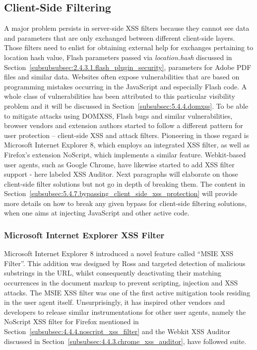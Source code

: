   \subsection{Client-Side Filtering}
  \label{subsec:4.4.client_side_filtering}
    
    A major problem persists in server-side XSS filters because they cannot see data and parameters that are only exchanged between different client-side layers. Those filters need to enlist for obtaining external help for exchanges pertaining to location hash value, Flash parameters passed via \textit{location.hash} discussed in Section~\ref{subsubsubsec:2.4.3.1.flash_plugin_security}, parameters for Adobe PDF files and similar data. Websites often expose vulnerabilities that are based on programming mistakes occurring in the JavaScript and especially Flash code. A whole  class of vulnerabilities has been attributed to this particular visibility problem and it will be discussed in Section~\ref{subsubsec:5.4.4.domxss}. To be able to mitigate attacks using DOMXSS, Flash bugs and similar vulnerabilities, browser vendors and extension authors started to follow a different pattern for user protection -- client-side XSS and attack filters. Pioneering in those regard is Microsoft Internet Explorer 8, which employs 
an integrated XSS filter, as well as Firefox's extension NoScript, which implements a similar feature. Webkit-based user agents, such as Google Chrome, have likewise started to add XSS filter support - here labeled XSS Auditor. Next paragraphs will elaborate on those client-side filter solutions but not go in depth of breaking them. The content in Section~\ref{subsubsec:5.4.7.bypassing_client_side_xss_protection} will provide more details on how to break any given bypass for client-side filtering solutions, when one aims at injecting JavaScript and other active code.


    \subsubsection{Microsoft Internet Explorer XSS Filter}
    \label{subsubsec:4.4.2.internet_explorer_xss_filter}

    Microsoft Internet Explorer 8 introduced a novel feature called ``MSIE XSS Filter''. This addition was designed by Ross and targeted  detection of malicious substrings in the URL, whilst consequently deactivating their matching occurrences in the document markup to prevent scripting, injection and XSS attacks. The MSIE XSS filter was one of the first active mitigation tools residing in the user agent itself. Unsurprisingly, it has inspired other vendors and developers to release similar instrumentations for other user agents, namely the NoScript XSS filter for Firefox mentioned in Section~\ref{subsubsec:4.4.4.noscript_xss_filter} and the Webkit XSS Auditor discussed in Section~\ref{subsubsec:4.4.3.chrome_xss_auditor}, have followed suite.\\

